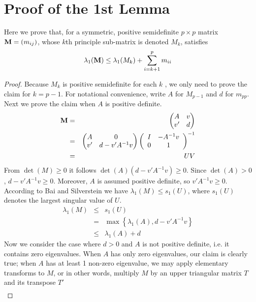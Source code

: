 \documentclass{article}
\begin{document}
\section{Proof of the 1st Lemma}
Here we prove that, for a symmetric, positive semidefinite $p \times
p$ matrix $\mathbf{M} = (m_{ij})$, whose $k$th principle sub-matrix is denoted
$M_k$, satisfies
\[
\lambda_1(\mathbf{M}) \leq \lambda_1(M_{k}) + \sum_{i=k+1}^p m_{ii}
\]
\begin{proof}
  Because $M_k$ is positive semidefinite for each $k$ , we only need
  to prove the claim for $k=p-1$. For notational convenience, write
  $A$ for $M_{p-1}$ and $d$ for $m_{pp}$. Next we prove the claim when
  $A$ is positive definite.
  \begin{eqnarray*}
    \mathbf{M} &=&
    \begin{pmatrix}
      A & v \\
      v' & d
    \end{pmatrix} \\
    &=&
    \begin{pmatrix}
      A & 0 \\
      v' & d - v' A^{-1} v
    \end{pmatrix}\left(
      \begin{array}{cc}
        I & -A^{-1} v \\
        0 & 1
      \end{array}\right)^{-1} \\
    &=& U V
  \end{eqnarray*}
  From $\det(M) \geq 0$ it follows $\det(A) (d - v' A^{-1} v) \geq
  0$. Since $\det(A) > 0$, $d - v' A^{-1} v \geq 0$. Moreover, $A$ is
  assumed positive definite, so $v' A^{-1} v \geq 0$. According
  to Bai and Silverstein\cite{BaiSilverstein2010} we have
  $\lambda_1(M) \leq s_1(U)$, where $s_1(U)$ denotes the largest
  singular value of $U$.
  \begin{eqnarray*}
    \lambda_1(M) &\leq& s_1(U) \\
    &=& \max\left\{\lambda_1(A), d - v' A^{-1} v \right\} \\
    &\leq& \lambda_1(A) + d
  \end{eqnarray*}
  Now we consider the case where $ d > 0$ and $A$ is not positive
  definite, i.e. it contains zero eigenvalues. When $A$ has only zero
  eigenvalues, our claim is clearly true; when $A$ has at least 1
  non-zero eigenvalue, we may apply elementary transforms to $M$,
  or in other words, multiply $M$ by an upper triangular matrix $T$
  and its transpose $T'$
  \begin{eqnarray*}

\end{eqnarray*}
\end{proof}
\end{document}
